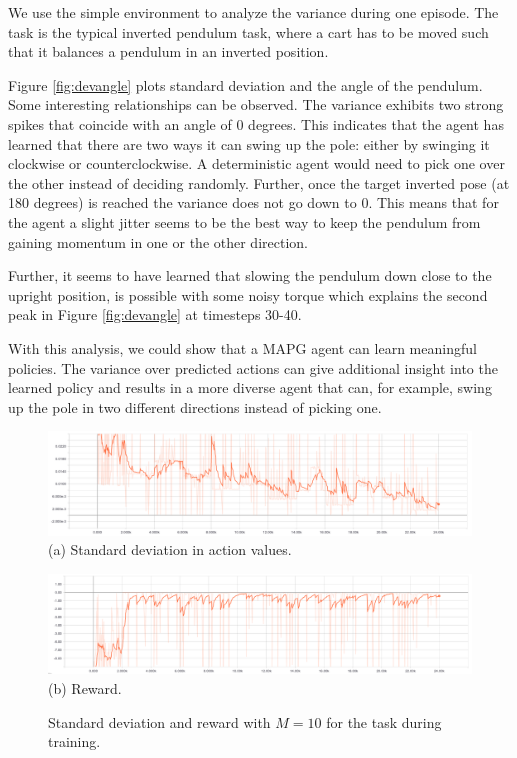 We use the simple  environment to analyze the variance during one episode. The task is the typical inverted pendulum task, where a cart has to be moved such that it balances a pendulum in an inverted position.

Figure \ref{fig:devangle} plots standard deviation and the angle of the pendulum. Some interesting relationships can be observed. The variance exhibits two strong spikes that coincide with an angle of $0$ degrees. This indicates that the agent has learned that there are two ways it can swing up the pole: either by swinging it clockwise or counterclockwise. A deterministic agent would need to pick one over the other instead of deciding randomly. Further, once the target inverted pose (at 180 degrees) is reached the variance does not go down to 0. This means that for the agent a slight jitter seems to be the best way to keep the pendulum from gaining momentum in one or the other direction.

Further, it seems to have learned that slowing the pendulum down close to the upright position, is possible with some noisy torque which explains the second peak in Figure \ref{fig:devangle} at timesteps 30-40. 

With this analysis, we could show that a MAPG agent can learn meaningful policies. The variance over predicted actions can give additional insight into the learned policy and results in a more diverse agent that can, for example, swing up the pole in two different directions instead of picking one.

\begin{figure}[H]
\centering
\begin{minipage}[b]{.9\textwidth}
  \centering
  \includegraphics[width=\textwidth]{figures/std_eval.png} \\
  (a) Standard deviation in action values.
\end{minipage}

\begin{minipage}[b]{.9\textwidth}
  \centering
    \includegraphics[width=\textwidth]{figures/reward_eval.png} \\
   (b) Reward.
\end{minipage}
  \caption{Standard deviation and reward with $M=10$ for the  task during training.}
  \label{fig:stddev}
\end{figure}


